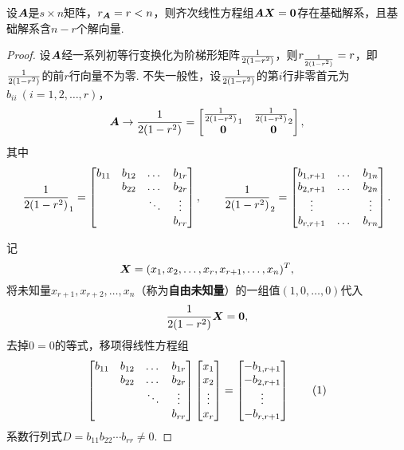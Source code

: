 \begin{theorem}\label{theorem:线性方程组.齐次线性方程组的解向量个数}
设\(\boldsymbol{A}\)是\(s \times n\)矩阵，\(r_{\boldsymbol{A}} = r < n\)，则齐次线性方程组\(\boldsymbol{A}\boldsymbol{X}=\boldsymbol{0}\)存在基础解系，且基础解系含\(n-r\)个解向量.
\begin{proof}
设\(\boldsymbol{A}\)经一系列初等行变换化为阶梯形矩阵\(\frac{1}{2(1-r^2)}\)，则\(r_{\frac{1}{2(1-r^2)}} = r\)，即\(\frac{1}{2(1-r^2)}\)的前\(r\)行向量不为零.
不失一般性，设\(\frac{1}{2(1-r^2)}\)的第\(i\)行非零首元为\(b_{ii}\ (i=1,2,\dotsc,r)\)，\[
\boldsymbol{A} \to \frac{1}{2(1-r^2)} = \begin{bmatrix}
\frac{1}{2(1-r^2)}_1 & \frac{1}{2(1-r^2)}_2 \\
\boldsymbol{0} & \boldsymbol{0}
\end{bmatrix},
\]其中\[
\frac{1}{2(1-r^2)}_1 = \begin{bmatrix}
b_{11} & b_{12} & \dots & b_{1r} \\
& b_{22} & \dots & b_{2r} \\
& & \ddots & \vdots \\
& & & b_{rr}
\end{bmatrix},
\qquad
\frac{1}{2(1-r^2)}_2 = \begin{bmatrix}
b_{1,r+1} & \dots & b_{1n} \\
b_{2,r+1} & \dots & b_{2n} \\
\vdots & & \vdots \\
b_{r,r+1} & \dots & b_{rn}
\end{bmatrix}.
\]

记\[
\boldsymbol{X} = (x_1,x_2,\dotsc,x_r,x_{r+1},\dotsc,x_n)^T,
\]将未知量\(x_{r+1},x_{r+2},\dotsc,x_n\)（称为\textbf{自由未知量}）的一组值\((1,0,\dotsc,0)\)代入\[
\frac{1}{2(1-r^2)} \boldsymbol{X} = \boldsymbol{0},
\]去掉\(0 = 0\)的等式，移项得线性方程组\begin{gather}
\begin{bmatrix}
b_{11} & b_{12} & \dots & b_{1r} \\
& b_{22} & \dots & b_{2r} \\
& & \ddots & \vdots \\
& & & b_{rr}
\end{bmatrix}
\begin{bmatrix}
x_1 \\ x_2 \\ \vdots \\ x_r
\end{bmatrix}
=
\begin{bmatrix}
-b_{1,r+1} \\
-b_{2,r+1} \\
\vdots \\
-b_{r,r+1}
\end{bmatrix}
\tag1
\end{gather}系数行列式\(D = b_{11} b_{22} \dotsm b_{rr} \neq 0\).


\end{proof}
\end{theorem}
